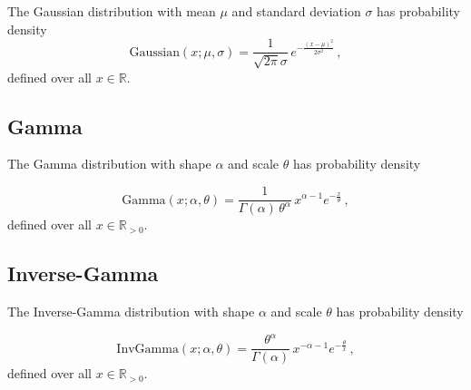 \documentclass[12pt,letterpaper,onecolumn,oneside]{article}
\begin{document}
\begin{appendices}
The Gaussian distribution with mean $\mu$ and standard deviation
$\sigma$ has probability density
\[ \text{Gaussian}(x; \mu, \sigma) = \frac{1}{\sqrt{2\pi}\sigma} \,
e^{-\frac{(x - \mu)^2}{2\sigma^2}} \, ,\] 
defined over all $x \in \mathbb{R}$.

\subsection{Gamma}

The Gamma distribution with shape $\alpha$ and scale $\theta$ has probability
density 

\[\text{Gamma}(x; \alpha, \theta) = \frac{1}{\Gamma(\alpha)\,
  \theta^\alpha} \,  x^{\alpha-1}  e^{-\frac{x}{\theta}} \, , \]
defined over all $x \in \mathbb{R}_{>0}$.

\subsection{Inverse-Gamma}

The Inverse-Gamma distribution with shape $\alpha$ and scale $\theta$
has probability density

\[\text{InvGamma}(x; \alpha, \theta) = \frac{\theta^\alpha}{\Gamma(\alpha)}
 \, x^{-\alpha-1} e^{-\frac{\theta}{x}} \, , \] defined over all $x \in
 \mathbb{R}_{>0}$.

\end{appendices}



\end{document}
